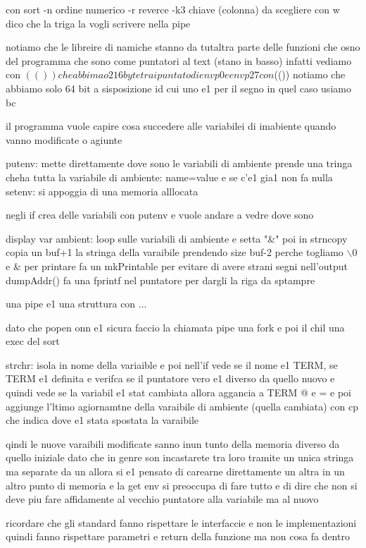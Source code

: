 con sort -n ordine numerico -r reverce -k3 chiave (colonna) da scegliere con w dico che la triga la vogli scrivere nella pipe

notiamo che le libreire di namiche stanno da tutaltra parte delle funzioni che osno del programma che sono come puntatori al text (stano in basso)
infatti vediamo con $(()) che abbimao 216 byte tra i puntato di envp0 e envp27 con $(()) notiamo che abbiamo solo 64 bit a sisposizione id cui uno e1 per il segno in quel caso usiamo bc

il programma vuole capire cosa succedere alle variabilei di imabiente quando vanno modificate o agiunte

putenv: mette direttamente dove sono le variabili di ambiente prende una tringa cheha tutta la variabile di ambiente: name=value e se c'e1 gia1 non fa nulla
setenv: si appoggia di una memoria alllocata

negli if crea delle variabili con putenv e vuole andare a vedre dove sono

display var ambient:
loop sulle variabili di ambiente e setta "\&" poi in strncopy copia un buf+1 la stringa della varaibile prendendo size buf-2 perche togliamo $\backslash 0$ e \&
per printare fa un mkPrintable per evitare di avere strani segni nell'output
dumpAddr() fa una fprintf nel puntatore per dargli la riga da sptampre



una pipe e1 una struttura con ...

dato che popen onn e1 sicura faccio la chiamata pipe una fork e poi il chil una exec del sort


strchr: isola in nome della variaible e poi nell'if vede se il nome e1 TERM, se TERM e1 definita e verifca se il puntatore vero e1 diverso da quello nuovo e quindi vede se la variabil e1 stat cambiata
allora aggancia a TERM @ e = e poi aggiunge l'ltimo agiornamtne della varaibile di ambiente (quella cambiata) 
con cp che indica dove e1 stata spostata la varaibile

qindi le nuove varaibili modificate sanno inun tunto della memoria diverso da quello iniziale dato che in genre son incastarete tra loro tramite un unica stringa ma separate da un \0 allora si e1 pensato di carearne direttamente un altra in un altro punto di memoria e la get env si preoccupa di fare tutto e di dire che non si deve piu fare affidamente al vecchio puntatore alla variabile ma al nuovo

ricordare che 
gli standard fanno rispettare le interfaccie e non le implementazioni quindi fanno rispettare parametri e return della funzione ma non cosa fa dentro


